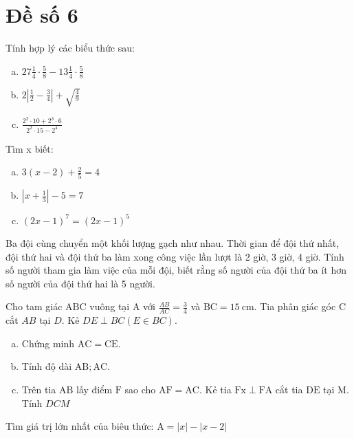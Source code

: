 \onehalfspacing
\section{Đề số 6}

\begin{bt} 
	Tính hợp lý các biểu thức sau:
	\begin{enumerate}[a.]
		\item $27 \frac{1}{4} \cdot \frac{5}{8}-13 \frac{1}{4} \cdot \frac{5}{8}$
		\item $2\left|\frac{1}{2}-\frac{3}{4}\right|+\sqrt{\frac{4}{9}}$
		\item $\frac{2^2 \cdot 10+2^3 \cdot 6}{2^2 \cdot 15-2^4}$
	\end{enumerate}
	\loigiai{} 
\end{bt}

\begin{bt}
	Tìm x biết:
	\begin{enumerate}[a.]
		\item $3(x-2)+\frac{2}{5}=4$
		\item $\left|x+\frac{1}{3}\right|-5=7$
		\item $(2 x-1)^7=(2 x-1)^5$
	\end{enumerate}
	\loigiai{} 
\end{bt}

\begin{bt}
	Ba đội cùng chuyển một khối lượng gạch như nhau. Thời gian để đội thứ nhất, đội 
	thứ hai và đội thứ ba làm xong công việc lần lượt là 2 giờ, 3 giờ, 4 giờ. Tính số 
	người tham gia làm việc của mỗi đội, biết rằng số người của đội thứ ba ít hơn số 
	người của đội thứ hai là 5 người.
	\loigiai{} 
\end{bt}

\begin{bt}
	Cho tam giác $\mathrm{ABC}$ vuông tại $\mathrm{A}$ với $\frac{A B}{A C}=\frac{3}{4}$ và $\mathrm{BC}=15 \mathrm{~cm}$. Tia phân giác góc $\mathrm{C}$ cắt $A B$ tại $D$. Kẻ $D E \perp B C(E \in B C)$.
	\begin{enumerate}[a.]
		\item Chứng minh $\mathrm{AC}=\mathrm{CE}$.
		\item Tính độ dài $\mathrm{AB} ; \mathrm{AC}$.
		\item Trên tia $\mathrm{AB}$ lấy điểm $\mathrm{F}$ sao cho $\mathrm{AF}=\mathrm{AC}$. Kẻ tia $\mathrm{Fx} \perp \mathrm{FA}$ cắt tia $\mathrm{DE}$ tại $\mathrm{M}$. Tính $D C M$
	\end{enumerate}
	\loigiai{}
\end{bt}

\begin{bt}
	
	Tìm giá trị lớn nhất của biêu thức: $\mathrm{A}=|x|-|x-2|$
	\loigiai{}
\end{bt}